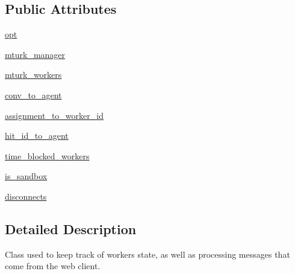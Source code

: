 \subsection*{Public Attributes}
\begin{DoxyCompactItemize}
\item 
\hyperlink{classparlai_1_1mturk_1_1core_1_1dev_1_1worker__manager_1_1WorkerManager_adb7992844dfa581014469721c7b6ebd8}{opt}
\item 
\hyperlink{classparlai_1_1mturk_1_1core_1_1dev_1_1worker__manager_1_1WorkerManager_ac998c8103c199cec59f152128f6b876c}{mturk\+\_\+manager}
\item 
\hyperlink{classparlai_1_1mturk_1_1core_1_1dev_1_1worker__manager_1_1WorkerManager_abb50897c2ac34971c1593cab077df63a}{mturk\+\_\+workers}
\item 
\hyperlink{classparlai_1_1mturk_1_1core_1_1dev_1_1worker__manager_1_1WorkerManager_a5ad208e55f54f2d2de934a17665b508d}{conv\+\_\+to\+\_\+agent}
\item 
\hyperlink{classparlai_1_1mturk_1_1core_1_1dev_1_1worker__manager_1_1WorkerManager_ad6da745885a93cca7e40eb3f21a42c36}{assignment\+\_\+to\+\_\+worker\+\_\+id}
\item 
\hyperlink{classparlai_1_1mturk_1_1core_1_1dev_1_1worker__manager_1_1WorkerManager_a90b094c83ec38bd8d95755cf99f2e771}{hit\+\_\+id\+\_\+to\+\_\+agent}
\item 
\hyperlink{classparlai_1_1mturk_1_1core_1_1dev_1_1worker__manager_1_1WorkerManager_a91e52a07f116d045069678e1b634ebeb}{time\+\_\+blocked\+\_\+workers}
\item 
\hyperlink{classparlai_1_1mturk_1_1core_1_1dev_1_1worker__manager_1_1WorkerManager_ae0e88a4e852d8e9577f9139aeaf9076b}{is\+\_\+sandbox}
\item 
\hyperlink{classparlai_1_1mturk_1_1core_1_1dev_1_1worker__manager_1_1WorkerManager_a7f6d658a79ddc418870fa31d23507070}{disconnects}
\end{DoxyCompactItemize}


\subsection{Detailed Description}
\begin{DoxyVerb}Class used to keep track of workers state, as well as processing messages that come
from the web client.
\end{DoxyVerb}
 

